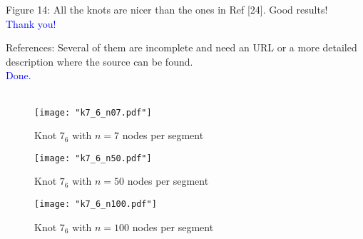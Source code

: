 \documentclass[12pt]{article}
\begin{document}
Figure 14: All the knots are nicer than the ones in Ref [24].  Good
results!\textcolor{blue}{\\Thank you!}


References: Several of them are incomplete and need an URL or a more
detailed description where the source can be found.
\textcolor{blue}{\\Done. \\ \\}


\begin{figure}[h]
  \centering
  \texttt{[image: "k7\_6\_n07.pdf"]}
  \caption{Knot \label{7_6_n7} $7_6$ with $n=7$ nodes per segment}
\end{figure}

\begin{figure}[h]
  \centering
  \texttt{[image: "k7\_6\_n50.pdf"]}
  \caption{Knot \label{7_6_n50} $7_6$ with $n=50$ nodes per segment}
\end{figure}

\begin{figure}[h]
  \centering
  \texttt{[image: "k7\_6\_n100.pdf"]}
  \caption{Knot \label{7_6_n100} $7_6$ with $n=100$ nodes per segment}
\end{figure}
\end{document}
